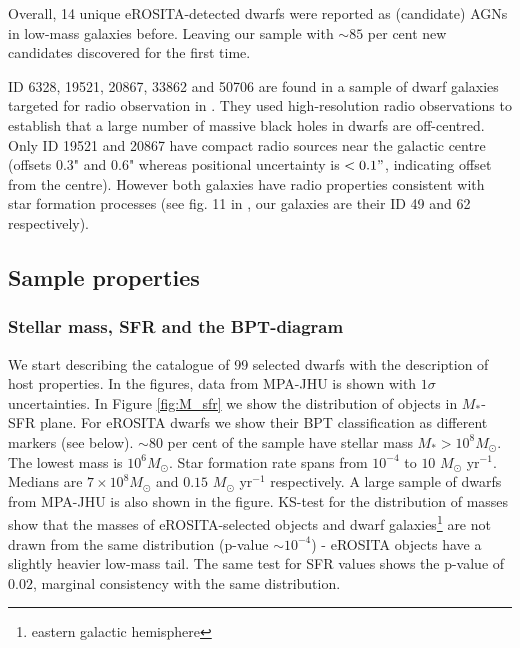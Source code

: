 \documentclass[fleqn,usenatbib]{mnras}
\newcommand{\msun}{M_\odot}
\begin{document}
Overall, 14 unique eROSITA-detected dwarfs were reported as (candidate) AGNs in low-mass galaxies before. Leaving our sample with $\sim85$ per cent new candidates discovered for the first time. 


ID 6328, 19521, 20867, 33862 and 50706 are found in a sample of  dwarf galaxies targeted for radio observation in \citet{Reines2020}. They used high-resolution radio observations to establish that a large number of massive black holes in dwarfs are off-centred. Only ID 19521  and 20867 have compact radio sources near the galactic centre (offsets 0.3" and 0.6" whereas positional uncertainty is $<0.1"$, indicating offset from the centre). However both galaxies have radio properties consistent with star formation processes (see fig. 11 in \citeauthor{Reines2020}, our galaxies are their ID 49 and 62 respectively).


\subsection{Sample properties}
\label{sect:results:optical}
\subsubsection{Stellar mass, SFR and the BPT-diagram}
\label{sect:results:optical:bpt}
We start describing the catalogue of 99 selected dwarfs with the description of host properties. In the figures, data from MPA-JHU is shown with $1\sigma$ uncertainties.
In Figure \ref{fig:M_sfr} we show the distribution of objects in $M_*$-SFR plane. For eROSITA dwarfs we show their BPT classification as different markers (see below). 
$\sim80$ per cent of the sample have stellar mass $M_*>10^{8} \msun$. The lowest mass is $10^6 \msun$. Star formation rate spans from $10^{-4}$ to $10$ $\msun$ yr$^{-1}$. Medians are $7\times10^8 \msun$ and $0.15$ $\msun$ yr$^{-1}$ respectively. A large sample of dwarfs from MPA-JHU is also shown in the figure. KS-test for the distribution of masses show that the masses of eROSITA-selected objects and dwarf galaxies\footnote{eastern galactic hemisphere} are not  drawn from the same distribution (p-value $\sim10^{-4}$) - eROSITA objects have a slightly heavier low-mass tail. The same test for SFR values shows the p-value of $0.02$, marginal consistency with the same distribution. 
\end{document}
